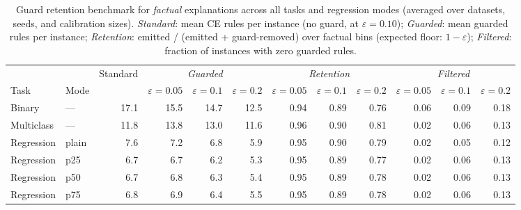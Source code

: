 \begin{table}[ht]
\centering
\footnotesize
\caption{Guard retention benchmark for \textit{factual} explanations across all tasks and regression modes (averaged over datasets, seeds, and calibration sizes). \textit{Standard}: mean CE rules per instance (no guard, at $\varepsilon=0.10$); \textit{Guarded}: mean guarded rules per instance; \textit{Retention}: emitted / (emitted + guard-removed) over factual bins (expected floor: $1-\varepsilon$); \textit{Filtered}: fraction of instances with zero guarded rules.}
\label{tab:guarded_scenario_c_factual}
\begin{tabular}{ll r|rrr|rrr|rrr}
\toprule
\multicolumn{2}{l}{} & \multicolumn{1}{c}{Standard} & \multicolumn{3}{c|}{\textit{Guarded}} & \multicolumn{3}{c|}{\textit{Retention}} & \multicolumn{3}{c}{\textit{Filtered}} \\
Task & Mode &  & $\varepsilon\!=\!0.05$ & $\varepsilon\!=\!0.1$ & $\varepsilon\!=\!0.2$ & $\varepsilon\!=\!0.05$ & $\varepsilon\!=\!0.1$ & $\varepsilon\!=\!0.2$ & $\varepsilon\!=\!0.05$ & $\varepsilon\!=\!0.1$ & $\varepsilon\!=\!0.2$ \\
\midrule
Binary & --- & 17.1 & 15.5 & 14.7 & 12.5 & 0.94 & 0.89 & 0.76 & 0.06 & 0.09 & 0.18 \\
Multiclass & --- & 11.8 & 13.8 & 13.0 & 11.6 & 0.96 & 0.90 & 0.81 & 0.02 & 0.06 & 0.13 \\
\midrule
Regression & plain & 7.6 & 7.2 & 6.8 & 5.9 & 0.95 & 0.90 & 0.79 & 0.02 & 0.05 & 0.12 \\
Regression & p25 & 6.7 & 6.7 & 6.2 & 5.3 & 0.95 & 0.89 & 0.77 & 0.02 & 0.06 & 0.13 \\
Regression & p50 & 6.7 & 6.8 & 6.3 & 5.4 & 0.95 & 0.89 & 0.78 & 0.02 & 0.06 & 0.13 \\
Regression & p75 & 6.8 & 6.9 & 6.4 & 5.5 & 0.95 & 0.89 & 0.78 & 0.02 & 0.06 & 0.13 \\
\bottomrule
\end{tabular}
\end{table}
